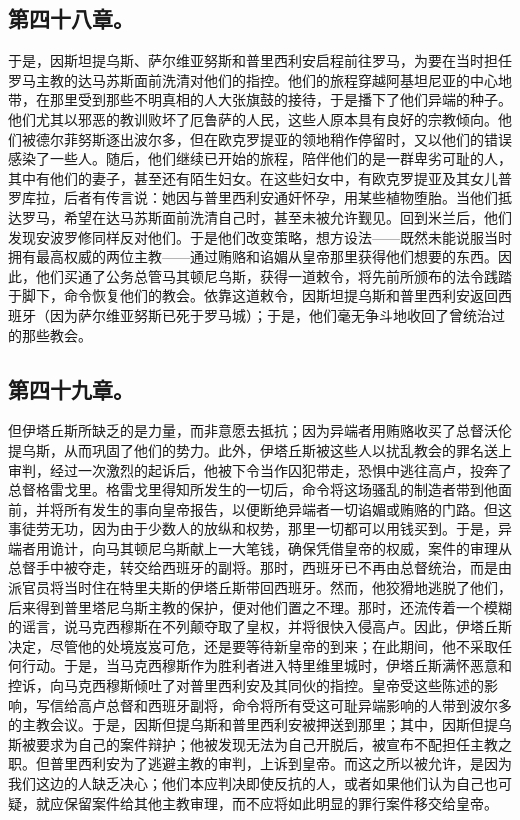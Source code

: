 
\subsection{第四十八章。}

于是，因斯坦提乌斯、萨尔维亚努斯和普里西利安启程前往罗马，为要在当时担任罗马主教的达马苏斯面前洗清对他们的指控。他们的旅程穿越阿基坦尼亚的中心地带，在那里受到那些不明真相的人大张旗鼓的接待，于是播下了他们异端的种子。他们尤其以邪恶的教训败坏了厄鲁萨的人民，这些人原本具有良好的宗教倾向。他们被德尔菲努斯逐出波尔多，但在欧克罗提亚的领地稍作停留时，又以他们的错误感染了一些人。随后，他们继续已开始的旅程，陪伴他们的是一群卑劣可耻的人，其中有他们的妻子，甚至还有陌生妇女。在这些妇女中，有欧克罗提亚及其女儿普罗库拉，后者有传言说：她因与普里西利安通奸怀孕，用某些植物堕胎。当他们抵达罗马，希望在达马苏斯面前洗清自己时，甚至未被允许觐见。回到米兰后，他们发现安波罗修同样反对他们。于是他们改变策略，想方设法——既然未能说服当时拥有最高权威的两位主教——通过贿赂和谄媚从皇帝那里获得他们想要的东西。因此，他们买通了公务总管马其顿尼乌斯，获得一道敕令，将先前所颁布的法令践踏于脚下，命令恢复他们的教会。依靠这道敕令，因斯坦提乌斯和普里西利安返回西班牙（因为萨尔维亚努斯已死于罗马城）；于是，他们毫无争斗地收回了曾统治过的那些教会。\par


\subsection{第四十九章。}

但伊塔丘斯所缺乏的是力量，而非意愿去抵抗；因为异端者用贿赂收买了总督沃伦提乌斯，从而巩固了他们的势力。此外，伊塔丘斯被这些人以扰乱教会的罪名送上审判，经过一次激烈的起诉后，他被下令当作囚犯带走，恐惧中逃往高卢，投奔了总督格雷戈里。格雷戈里得知所发生的一切后，命令将这场骚乱的制造者带到他面前，并将所有发生的事向皇帝报告，以便断绝异端者一切谄媚或贿赂的门路。但这事徒劳无功，因为由于少数人的放纵和权势，那里一切都可以用钱买到。于是，异端者用诡计，向马其顿尼乌斯献上一大笔钱，确保凭借皇帝的权威，案件的审理从总督手中被夺走，转交给西班牙的副将。那时，西班牙已不再由总督统治，而是由派官员将当时住在特里夫斯的伊塔丘斯带回西班牙。然而，他狡猾地逃脱了他们，后来得到普里塔尼乌斯主教的保护，便对他们置之不理。那时，还流传着一个模糊的谣言，说马克西穆斯在不列颠夺取了皇权，并将很快入侵高卢。因此，伊塔丘斯决定，尽管他的处境岌岌可危，还是要等待新皇帝的到来；在此期间，他不采取任何行动。于是，当马克西穆斯作为胜利者进入特里维里城时，伊塔丘斯满怀恶意和控诉，向马克西穆斯倾吐了对普里西利安及其同伙的指控。皇帝受这些陈述的影响，写信给高卢总督和西班牙副将，命令将所有受这可耻异端影响的人带到波尔多的主教会议。于是，因斯但提乌斯和普里西利安被押送到那里；其中，因斯但提乌斯被要求为自己的案件辩护；他被发现无法为自己开脱后，被宣布不配担任主教之职。但普里西利安为了逃避主教的审判，上诉到皇帝。而这之所以被允许，是因为我们这边的人缺乏决心；他们本应判决即使反抗的人，或者如果他们认为自己也可疑，就应保留案件给其他主教审理，而不应将如此明显的罪行案件移交给皇帝。\par

